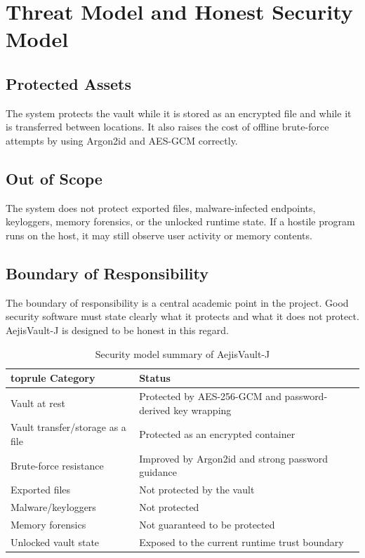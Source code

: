 \documentclass[12pt,a4paper]{report}
\newcommand{\projname}{AejisVault-J}
\begin{document}
\chapter{Threat Model and Honest Security Model}
\section{Protected Assets}
The system protects the vault while it is stored as an encrypted file and while it is transferred between locations. It also raises the cost of offline brute-force attempts by using Argon2id and AES-GCM correctly.

\section{Out of Scope}
The system does not protect exported files, malware-infected endpoints, keyloggers, memory forensics, or the unlocked runtime state. If a hostile program runs on the host, it may still observe user activity or memory contents.

\section{Boundary of Responsibility}
The boundary of responsibility is a central academic point in the project. Good security software must state clearly what it protects and what it does not protect. \projname{} is designed to be honest in this regard.

\begin{table}[H]
\centering
\caption{Security model summary of \projname{}}
\begin{tabular}{p{} p{}}
\csname toprule\endcsname
{\bfseries Category} & {\bfseries Status} \\
\midrule
Vault at rest & Protected by AES-256-GCM and password-derived key wrapping \\
Vault transfer/storage as a file & Protected as an encrypted container \\
Brute-force resistance & Improved by Argon2id and strong password guidance \\
Exported files & Not protected by the vault \\
Malware/keyloggers & Not protected \\
Memory forensics & Not guaranteed to be protected \\
Unlocked vault state & Exposed to the current runtime trust boundary \\
\bottomrule
\end{tabular}
\label{tab:security-model}
\end{table}
\end{document}
